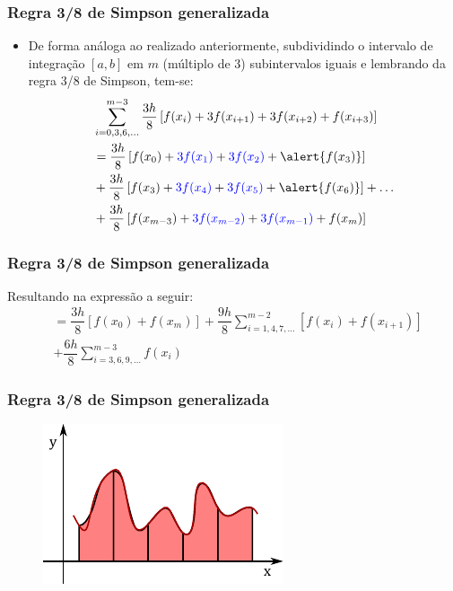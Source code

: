 \documentclass{beamer}
\theoremstyle{mystyle}
\begin{document}
\begin{frame}
	\frametitle{Regra 3/8 de Simpson generalizada}
	\begin{itemize}
		\item De forma análoga ao realizado anteriormente, subdividindo o intervalo de integração $ [a, b] $ em $ m $ (múltiplo de 3) subintervalos iguais e lembrando da regra 3/8 de Simpson, tem-se:
		\begin{align*}
			&\sum_{i=0,3,6,\ldots}^{m-3}\dfrac{3h}{8}\left[ f(x_{i}) + 3f(x_{i+1}) + 3f(x_{i+2}) + f(x_{i+3}) \right] \\
			&= \dfrac{3h}{8}\left[ f(x_{0}) + \textcolor{blue}{3f(x_{1})} + \textcolor{blue}{3f(x_{2})} + \alert{f(x_{3})} \right]\\
			&+ \dfrac{3h}{8}\left[ f(x_{3}) + \textcolor{blue}{3f(x_{4})} + \textcolor{blue}{3f(x_{5})} + \alert{f(x_{6})} \right] + \ldots\\
			&+ \dfrac{3h}{8}\left[ f(x_{m-3}) + \textcolor{blue}{3f(x_{m-2})} + \textcolor{blue}{3f(x_{m-1})} + f(x_{m}) \right] 
		\end{align*}
	\end{itemize}
\end{frame}

\begin{frame}
	\frametitle{Regra 3/8 de Simpson generalizada}
	Resultando na expressão a seguir:
	\begin{align*}
		&= \dfrac{3h}{8}\left[ f(x_{0}) + f(x_{m}) \right] +  \dfrac{9h}{8}\sum_{i=1,4,7,\ldots}^{m-2} \left[ f(x_{i}) + f(x_{i+1})\right]\\
		&+ \dfrac{6h}{8}\sum_{i=3,6,9,\ldots}^{m-3} f(x_{i})
	\end{align*}

\end{frame}

\begin{frame}
	\frametitle{Regra 3/8 de Simpson generalizada}
	\begin{figure}
		\centering
		\includegraphics[width=0.8\linewidth]{Figuras/grafico_09}
		\label{fig:grafico09}
	\end{figure}
\end{frame}
\end{document}
